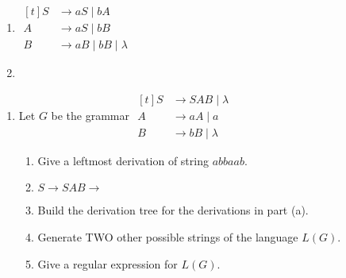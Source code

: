 \documentclass[a4paper, 12pt]{article}
\makeatletter
\renewenvironment{proof}[1][\proofname]{\par
  \normalfont \topsep6\p@\@plus6\p@\relax
  \trivlist
  \item[\hskip\labelsep
        \itshape
    #1\@addpunct{.}]\ignorespaces
}{%
  \endtrivlist\@endpefalse
}
\renewcommand{\proofname}{Solution:}
\makeatother
\begin{document}
\begin{enumerate}
\begin{enumerate}
            \item \( \begin{aligned}[t]
                S &\to aS \mid bA \\
                A &\to aS \mid bB \\
                B &\to aB \mid bB \mid \lambda
            \end{aligned} \)

            \begin{proof}
                \leavevmode \par

                \begin{center}
                \end{center}
            \end{proof}
        \end{enumerate}
    \end{enumerate}

    \newpage

    \begin{enumerate}
        \item Let $G$ be the grammar
        \( \begin{aligned}[t]
            S &\to SAB \mid \lambda \\
            A &\to aA \mid a \\
            B &\to bB \mid \lambda 
        \end{aligned} \)
        \begin{enumerate}
            \item Give a leftmost derivation of string $abbaab$.
            \begin{proof}
                $S \to SAB \to $
            \end{proof}

            \item Build the derivation tree for the derivations in part (a).
            \item Generate TWO other possible strings of the language $L(G)$.
            \item Give a regular expression for $L(G)$.
        \end{enumerate}
    \end{enumerate}
\end{document}
